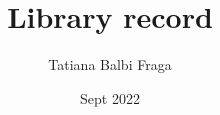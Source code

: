 \documentclass{article}
\title{Library record}
\author{Tatiana Balbi Fraga}
\date{Sept 2022}
\begin{document}
\maketitle

\newenvironment{mcsection}[1]
    {%
        \textbf{#1}

        \begin{itemize}[leftmargin=*,topsep=0pt,itemsep=-1ex,partopsep=1ex,parsep=1ex,after=\vspace{\medskipamount}]
    }
    {%
        \end{itemize}
    }
\end{document}
